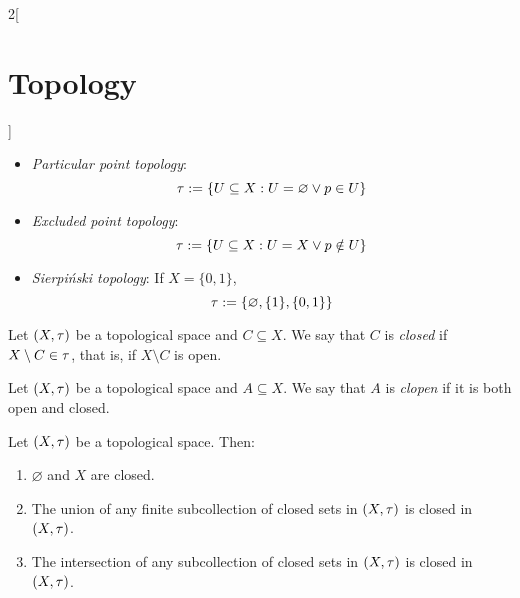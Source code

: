 \documentclass[../../../main_math.tex]{subfiles}
\begin{document}
\begin{multicols}{2}[\section{Topology}]
\begin{proposition}
\begin{itemize}
      \item \emph{Particular point topology}: $$\tau:=\{U\subseteq X:U=\varnothing\lor p\in U\}$$
      \item \emph{Excluded point topology}: $$\tau:=\{U\subseteq X:U=X\lor p\notin U\}$$
      \item \emph{Sierpiński topology}: If $X=\{0,1\}$, $$\tau:=\{\varnothing,\{1\},\{0,1\}\}$$
    \end{itemize}
  \end{proposition}
  \begin{definition}
    Let $(X,\tau)$ be a topological space and $C\subseteq X$. We say that $C$ is \emph{closed} if $X\setminus C\in\tau$, that is, if $X\setminus C$ is open.
  \end{definition}
  \begin{definition}
    Let $(X,\tau)$ be a topological space and $A\subseteq X$. We say that $A$ is \emph{clopen} if it is both open and closed.
  \end{definition}
  \begin{proposition}
    Let $(X,\tau)$ be a topological space. Then:
    \begin{enumerate}
      \item $\varnothing$ and $X$ are closed.
      \item The union of any finite subcollection of closed sets in $(X,\tau)$ is closed in $(X,\tau)$.
      \item The intersection of any subcollection of closed sets in $(X,\tau)$ is closed in $(X,\tau)$.
    \end{enumerate}
  \end{proposition}

\end{multicols}
\end{document}
